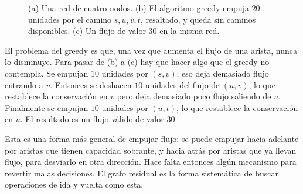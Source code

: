 \documentclass[12pt, spanish, oneside, openany]{book}
\theoremstyle{uprightplain}
\theoremstyle{definition}
\theoremstyle{remark}
\theoremstyle{definition}
\newcommand{\fc}[2]{#1/#2}               %
\begin{document}
\begin{figure}[H]
\centering
{}
\caption{(a) Una red de cuatro nodos. (b) El algoritmo greedy empuja $20$
unidades por el camino $s,u,v,t$, resaltado, y queda sin caminos disponibles.
(c) Un flujo de valor $30$ en la misma red.}
\label{fig:flujo-greedy}
\end{figure}

El problema del greedy es que, una vez que aumenta el flujo de una arista, nunca lo disminuye. Para pasar de (b) a (c) hay que hacer algo que el greedy no contempla. Se empujan $10$ unidades por $(s,v)$; eso deja demasiado flujo entrando a $v$. Entonces se deshacen $10$ unidades del flujo de $(u,v)$, lo que restablece la conservación en $v$ pero deja demasiado poco flujo saliendo de $u$. Finalmente se empujan $10$ unidades por $(u,t)$, lo que restablece la conservación en $u$. El resultado es un flujo válido de valor $30$.

Esta es una forma más general de empujar flujo: se puede empujar hacia adelante por aristas que tienen capacidad sobrante, y hacia atrás por aristas que ya llevan flujo, para desviarlo en otra dirección. Hace falta entonces algún mecanismo para revertir malas decisiones. El grafo residual es la forma sistemática de buscar operaciones de ida y vuelta como esta.
\end{document}
